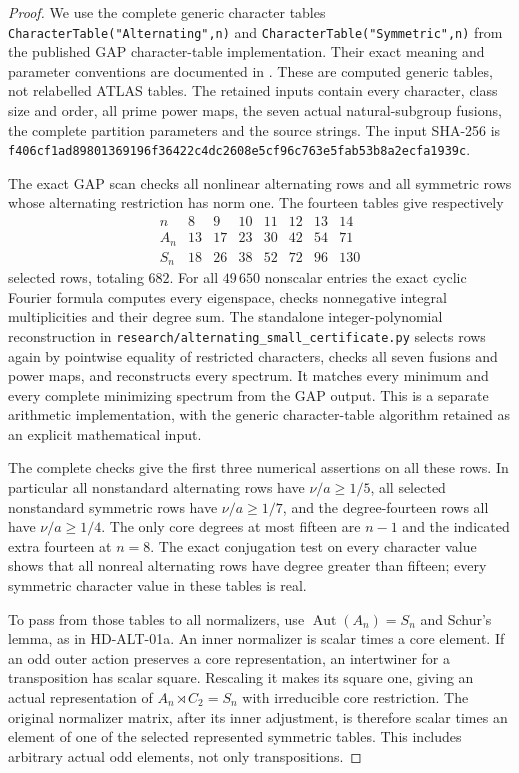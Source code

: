 \begin{proof}
We use the complete generic character tables
\texttt{CharacterTable("Alternating",n)} and
\texttt{CharacterTable("Symmetric",n)} from the published GAP
character-table implementation.  Their exact meaning and parameter
conventions are documented in \cite[\S4.2 and \S4.2-1]{SPOR:CTblLib}.
These are computed generic tables, not relabelled ATLAS tables.
The retained inputs contain every character, class size and order,
all prime power maps, the seven actual natural-subgroup fusions,
the complete partition parameters and the source strings.
The input SHA-256 is
\texttt{f406cf1ad89801369196f36422c4dc2608e5cf96c763e5fab53b8a2ecfa1939c}.

The exact GAP scan checks all nonlinear alternating rows and all
symmetric rows whose alternating restriction has norm one.  The
fourteen tables give respectively
\[
\begin{array}{c|rrrrrrr}
n&8&9&10&11&12&13&14\\\hline
A_n&13&17&23&30&42&54&71\\
S_n&18&26&38&52&72&96&130
\end{array}
\]
selected rows, totaling $682$.  For all $49\,650$ nonscalar entries
the exact cyclic Fourier formula computes every eigenspace,
checks nonnegative integral multiplicities and their degree sum.
The standalone integer-polynomial reconstruction in
\texttt{research/alternating\_small\_certificate.py} selects rows
again by pointwise equality of restricted characters, checks all
seven fusions and power maps, and reconstructs every spectrum.
It matches every minimum and every complete minimizing spectrum
from the GAP output.  This is a separate arithmetic implementation,
with the generic character-table algorithm retained as an explicit
mathematical input.

The complete checks give the first three numerical assertions
on all these rows.  In particular all nonstandard alternating
rows have $\nu/a\ge1/5$, all selected nonstandard symmetric
rows have $\nu/a\ge1/7$, and the degree-fourteen rows all have
$\nu/a\ge1/4$.  The only core degrees at most fifteen are
$n-1$ and the indicated extra fourteen at $n=8$.
The exact conjugation test on every character value shows that
all nonreal alternating rows have degree greater than fifteen;
every symmetric character value in these tables is real.

To pass from those tables to all normalizers, use
$\operatorname{Aut}(A_n)=S_n$ and Schur's lemma, as in
HD-ALT-01a.  An inner normalizer is scalar times a core element.
If an odd outer action preserves a core representation, an
intertwiner for a transposition has scalar square.  Rescaling
it makes its square one, giving an actual representation of
$A_n\rtimes C_2=S_n$ with irreducible core restriction.
The original normalizer matrix, after its inner adjustment,
is therefore scalar times an element of one of the selected
represented symmetric tables.  This includes arbitrary actual
odd elements, not only transpositions.


\end{proof}
